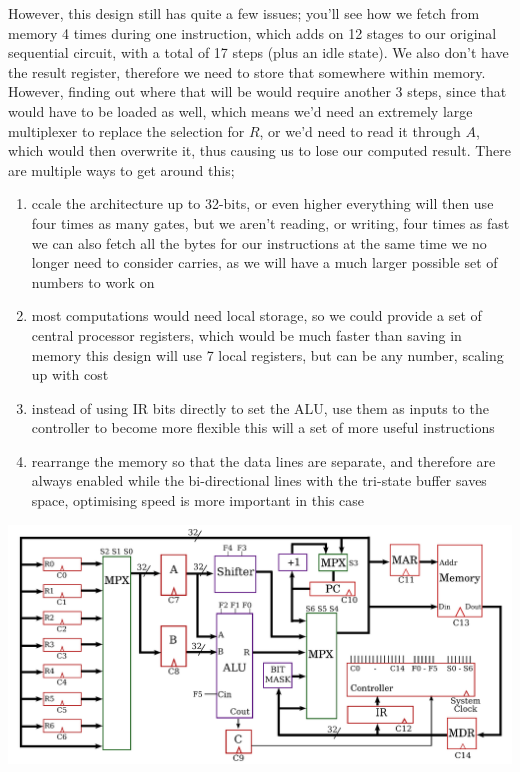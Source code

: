 \documentclass[a4paper, 12pt]{article}
\begin{document}
            However, this design still has quite a few issues; you'll see how we fetch from memory 4 times during one instruction, which adds on 12 stages to our original sequential circuit, with a total of 17 steps (plus an idle state). We also don't have the result register, therefore we need to store that somewhere within memory. However, finding out where that will be would require another 3 steps, since that would have to be loaded as well, which means we'd need an extremely large multiplexer to replace the selection for $R$, or we'd need to read it through $A$, which would then overwrite it, thus causing us to lose our computed result. There are multiple ways to get around this;
            \begin{enumerate}[1.]
                \itemsep0em
                \item ccale the architecture up to 32-bits, or even higher
                    \subitem everything will then use four times as many gates, but we aren't reading, or writing, four times as fast
                    \subitem we can also fetch all the bytes for our instructions at the same time
                    \subitem we no longer need to consider carries, as we will have a much larger possible set of numbers to work on
                \item most computations would need local storage, so we could provide a set of central processor registers, which would be much faster than saving in memory
                    \subitem this design will use 7 local registers, but can be any number, scaling up with cost
                \item instead of using IR bits directly to set the ALU, use them as inputs to the controller to become more flexible
                    \subitem this will a set of more useful instructions
                \item rearrange the memory so that the data lines are separate, and therefore are always enabled
                    \subitem while the bi-directional lines with the tri-state buffer saves space, optimising speed is more important in this case
            \end{enumerate}

            \includegraphics[width=\linewidth]{2019-04-11-18-21-11.png}
\end{document}
